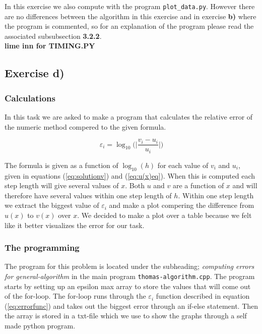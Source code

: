 \documentclass{article}
\begin{document}
    In this exercise we also compute with the program \texttt{plot\_data.py}. However there are no differences between the algorithm in this exercise and in exercise \textbf{b)} where the program is commented, so for an explanation of the program please read the associated subsubsection \textbf{3.2.2}. \\

    {\large  \bf lime inn for TIMING.PY}


\subsection{Exercise d)} \label{Method c)}


  \subsubsection{Calculations}

    In this task we are asked to make a program that calculates the relative error of the numeric method compered to the given formula.

    \begin{equation}
      \varepsilon_i = \log_{10} \bigg( \bigg| \frac{v_i - u_i}{u_i} \bigg| \bigg)    \label{eq:errorfunc}
    \end{equation}

    The formula is given as a function of $\log_{10}(h)$ for each value of $v_i$ and $u_i$, given in equations (\ref{eq:solutionv}) and (\ref{eq:u(x)eq}). When this is computed each step length will give several values of $x$. Both $u$ and $v$ are a function of $x$ and will therefore have several values within one step length of $h$. Within one step length we extract the biggest value of $\varepsilon_i$ and make a plot compering the difference from $u(x)$ to $v(x)$ over $x$. We decided to make a plot over a table because we felt like it better visualizes the error for our task.


  \subsubsection{The programming}

    The program for this problem is located under the subheading; \textit{computing errors for general-algorithm} in the main program \texttt{thomas-algorithm.cpp}. The program starts by setting up an epsilon max array to store the values that will come out of the for-loop. The for-loop runs through the $\varepsilon_i$ function described in equation (\ref{eq:errorfunc}) and takes out the biggest error through an if-else statement. Then the array is stored in a txt-file which we use to show the graphs through a self made python program. \\
\end{document}
